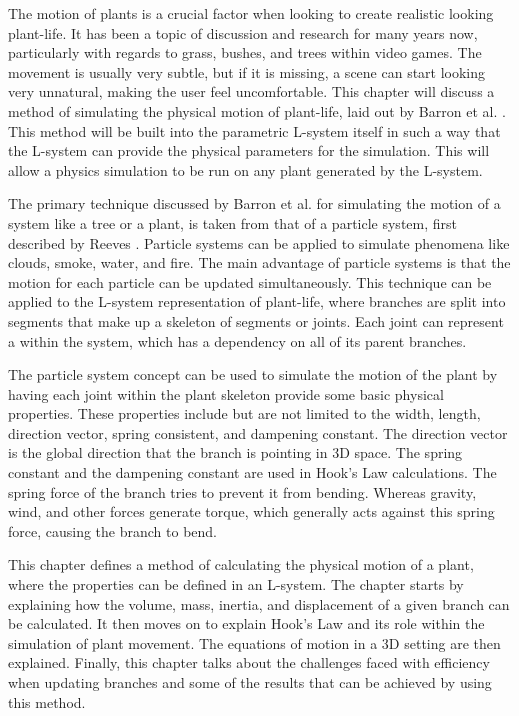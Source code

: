\lettrine[lines=3]{T}{}he motion of plants is a crucial factor when looking to create realistic looking plant-life. It has been a topic of discussion and research for many years now, particularly with regards to grass, bushes, and trees within video games. The movement is usually very subtle, but if it is missing, a scene can start looking very unnatural, making the user feel uncomfortable. This chapter will discuss a method of simulating the physical motion of plant-life, laid out by Barron et al. \cite{barron2001real}. This method will be built into the parametric L-system itself in such a way that the L-system can provide the physical parameters for the simulation. This will allow a physics simulation to be run on any plant generated by the L-system.

The primary technique discussed by Barron et al. for simulating the motion of a system like a tree or a plant, is taken from that of a particle system, first described by Reeves \cite{reeves1983particle}. Particle systems can be applied to simulate phenomena like clouds, smoke, water, and fire. The main advantage of particle systems is that the motion for each particle can be updated simultaneously. This technique can be applied to the L-system representation of plant-life, where branches are split into segments that make up a skeleton of segments or joints. Each joint can represent a  within the system, which has a dependency on all of its parent branches.

The particle system concept can be used to simulate the motion of the plant by having each joint within the plant skeleton provide some basic physical properties. These properties include but are not limited to the width, length, direction vector, spring consistent, and dampening constant. The direction vector is the global direction that the branch is pointing in 3D space. The spring constant and the dampening constant are used in Hook's Law calculations. The spring force of the branch tries to prevent it from bending. Whereas gravity, wind, and other forces generate torque, which generally acts against this spring force, causing the branch to bend.

This chapter defines a method of calculating the physical motion of a plant, where the properties can be defined in an L-system. The chapter starts by explaining how the volume, mass, inertia, and displacement of a given branch can be calculated. It then moves on to explain Hook's Law and its role within the simulation of plant movement. The equations of motion in a 3D setting are then explained. Finally, this chapter talks about the challenges faced with efficiency when updating branches and some of the results that can be achieved by using this method. 


